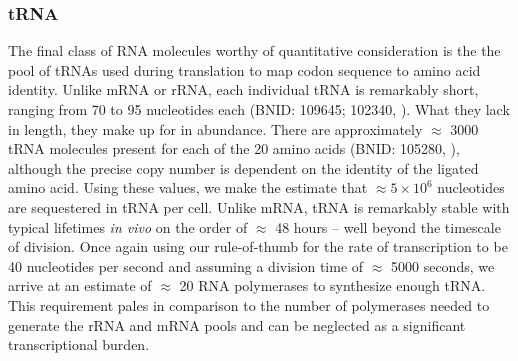 \subsubsection{tRNA}
The final class of RNA molecules worthy of quantitative consideration is the
the pool of tRNAs used during translation to map codon sequence to amino acid
identity. Unlike mRNA or rRNA, each individual tRNA is remarkably short,
ranging from 70 to 95 nucleotides each (BNID: 109645; 102340,
\cite{milo2010}). What they lack in length, they make up for in abundance.
There are approximately $\approx$ 3000 tRNA molecules present for each of the
20 amino acids (BNID: 105280, \cite{milo2010}), although the precise copy
number is dependent on the identity of the ligated amino acid.  Using these
values, we make the estimate that $\approx 5 \times 10^6$ nucleotides are
sequestered in tRNA per cell. Unlike mRNA, tRNA is remarkably stable with
typical lifetimes \textit{in vivo} on the order of $\approx$ 48 hours
\citep{abelson1974,svenningsen2017} -- well
beyond the timescale of division. Once again using our rule-of-thumb for the
rate of transcription to be 40 nucleotides per second and assuming a division
time of $\approx$ 5000 seconds, we arrive at an estimate of $\approx$ 20 RNA polymerases to 
synthesize enough tRNA. This requirement pales in comparison to the number of polymerases
needed to generate the rRNA and mRNA pools and can be neglected as a significant
transcriptional burden.

